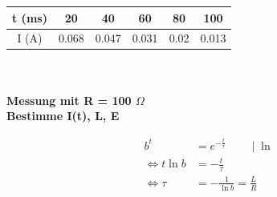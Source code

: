 \documentclass{article}
\begin{document}
	\begin{minipage}[t]{0.48\textwidth}
		\begin{tabular}{|c|c|c|c|c|c|}
		\hline
		t (ms) & 20 & 40 & 60 & 80 & 100\\
		\hline
		I (A) & 0.068 & 0.047 & 0.031 & 0.02 & 0.013\\
		\hline
		\end{tabular}\\
		\\
		\textbf{Messung mit R = 100 $\Omega$\\
		Bestimme I(t), L, E}
	\end{minipage}
	\hfill
	\begin{minipage}[t]{0.4\textwidth}
		\begin{align}
		b^t &= e^{- \frac{t}{\tau}} \qquad \mid \ln \\
		\Leftrightarrow t \ln b &= - \frac{t}{\tau} \\
		\Leftrightarrow \tau &= - \frac{1}{\ln b} = \frac{L}{R}
		\end{align}		
	\end{minipage}
	
\end{document}
